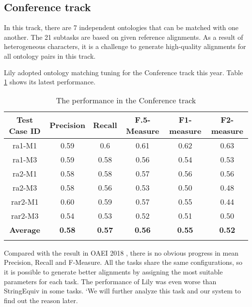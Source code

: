 \documentclass[runningheads]{llncs}
\begin{document}
\subsection{Conference track}
In this track, there are 7 independent ontologies that can be matched with one another. The 21 subtasks are based on given reference alignments. As a result of heterogeneous characters, it is a challenge to generate high-quality alignments for all ontology pairs in this track. \par
Lily adopted ontology matching tuning for the Conference track this year. Table \ref{tab:perf_conference} shows its latest performance. \par
\begin{table}[H]
\caption{The performance in the Conference track} \label{tab:perf_conference}
\centering
\begin{tabular}{c|c|c|c|c|c}
\Xhline{1.5pt}
Test Case ID & Precision & Recall & F.5-Measure & F1-measure & F2-measure\\ \hline
\Xhline{0.5pt}
ra1-M1 & 0.59 & 0.6 & 0.61 & 0.62 & 0.63 \\ \hline
ra1-M3 & 0.59 & 0.58 & 0.56 & 0.54 & 0.53 \\ \hline
ra2-M1 & 0.58 & 0.58 & 0.57 & 0.56 & 0.56 \\ \hline
ra2-M3 & 0.58 & 0.56 & 0.53 & 0.50 & 0.48 \\ \hline
rar2-M1 & 0.60 & 0.59 & 0.57 & 0.55 & 0.44 \\ \hline
rar2-M3 & 0.54 & 0.53 & 0.52 & 0.51 & 0.50 \\ \hline

\textbf{Average} & \textbf{0.58} & \textbf{0.57} & \textbf{0.56} &  \textbf{0.55} & \textbf{0.52}\\
\Xhline{1.5pt}
\end{tabular}
\end{table}
Compared with the result in OAEI 2018 \cite{lily_oaei2018}, there is no obvious progress in mean Precision, Recall and F-Measure. 
All the tasks share the same configurations, so it is possible to generate better alignments by assigning the most suitable parameters for each task. 
The performance of Lily was even worse than StringEquiv in some tasks. 
`We will further analyze this task and our system to find out the reason later.
\end{document}

